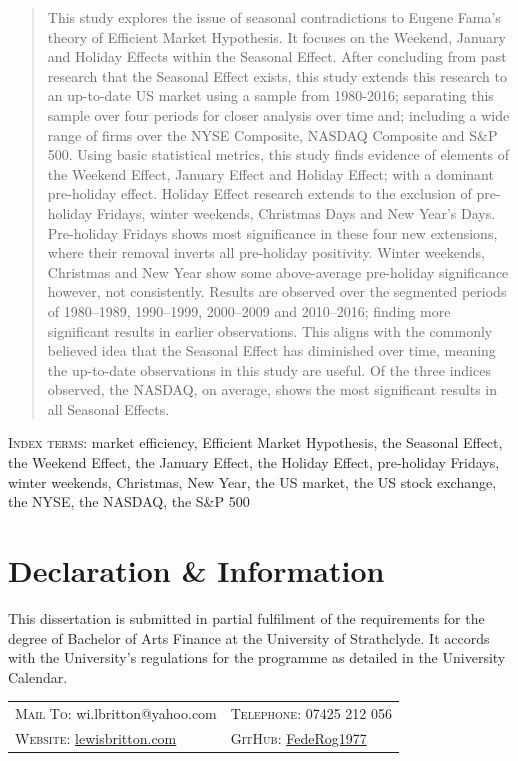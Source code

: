 \documentclass[11pt, english]{article}
\begin{document}
	\begin{abstract}
		This study explores the issue of seasonal contradictions to Eugene Fama’s theory of Efficient Market Hypothesis. It focuses on the Weekend, January and Holiday Effects within the Seasonal Effect. After concluding from past research that the Seasonal Effect exists, this study extends this research to an up-to-date US market using a sample from 1980-2016; separating this sample over four periods for closer analysis over time and; including a wide range of firms over the NYSE Composite, NASDAQ Composite and S\&P 500. Using basic statistical metrics, this study finds evidence of elements of the Weekend Effect, January Effect and Holiday Effect; with a dominant pre-holiday effect. Holiday Effect research extends to the exclusion of pre-holiday Fridays, winter weekends, Christmas Days and New Year’s Days. Pre-holiday Fridays shows most significance in these four new extensions, where their removal inverts all pre-holiday positivity. Winter weekends, Christmas and New Year show some above-average pre-holiday significance however, not consistently. Results are observed over the segmented periods of 1980--1989, 1990--1999, 2000--2009 and 2010--2016; finding more significant results in earlier observations. This aligns with the commonly believed idea that the Seasonal Effect has diminished over time, meaning the up-to-date observations in this study are useful. Of the three indices observed, the NASDAQ, on average, shows the most significant results in all Seasonal Effects.
	\end{abstract}

	\textsc{Index terms: }market efficiency, Efficient Market Hypothesis, the Seasonal Effect, the Weekend Effect, the January Effect, the Holiday Effect, pre-holiday Fridays, winter weekends, Christmas, New Year, the US market, the US stock exchange, the NYSE, the NASDAQ, the S\&P 500 

\newpage

	\section*{Declaration \& Information}

	This dissertation is submitted in partial fulfilment of the requirements for the degree of Bachelor of Arts Finance at the University of Strathclyde. It accords with the University’s regulations for the programme as detailed in the University Calendar.

	\begin{center}
		\small
	\begin{tabular}{p{5.45cm}|p{5.45cm}}
		\textsc{Mail To:} wi.lbritton@yahoo.com & \textsc{Telephone:} 07425 212 056\\
		\textsc{Website:} \href{http://lewisbritton.com}{lewisbritton.com} & \textsc{GitHub:} \href{https://github.com/FedeRog1977}{FedeRog1977}\\
	\end{tabular}
	\end{center}
\end{document}
